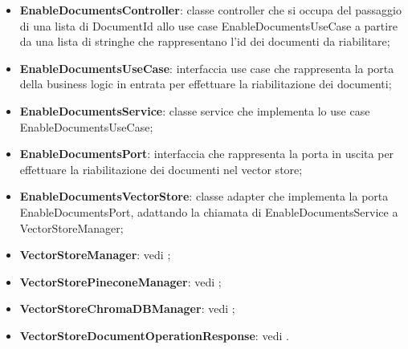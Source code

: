 \documentclass[10pt, a4paper]{article}
\begin{document}
\begin{itemize}
    \item \label{EnableDocumentsController}\textbf{EnableDocumentsController}: classe controller che si occupa del passaggio di una lista di DocumentId allo use case EnableDocumentsUseCase a partire da una lista di stringhe che rappresentano l'id dei documenti da riabilitare;
    \item \label{EnableDocumentsUseCase}\textbf{EnableDocumentsUseCase}: interfaccia use case che rappresenta la porta della business logic in entrata per effettuare la riabilitazione dei documenti;
    \item \label{EnableDocumentsService}\textbf{EnableDocumentsService}: classe service che implementa lo use case EnableDocumentsUseCase;
    \item \label{EnableDocumentsPort}\textbf{EnableDocumentsPort}: interfaccia che rappresenta la porta in uscita per effettuare la riabilitazione dei documenti nel vector store;
    \item \label{EnableDocumentsVectorStore}\textbf{EnableDocumentsVectorStore}: classe adapter che implementa la porta EnableDocumentsPort, adattando la chiamata di EnableDocumentsService a VectorStoreManager;
    \item \textbf{VectorStoreManager}: vedi ;
    \item \textbf{VectorStorePineconeManager}: vedi ;
    \item \textbf{VectorStoreChromaDBManager}: vedi ;
    \item \textbf{VectorStoreDocumentOperationResponse}: vedi .
\end{itemize}
\end{document}
